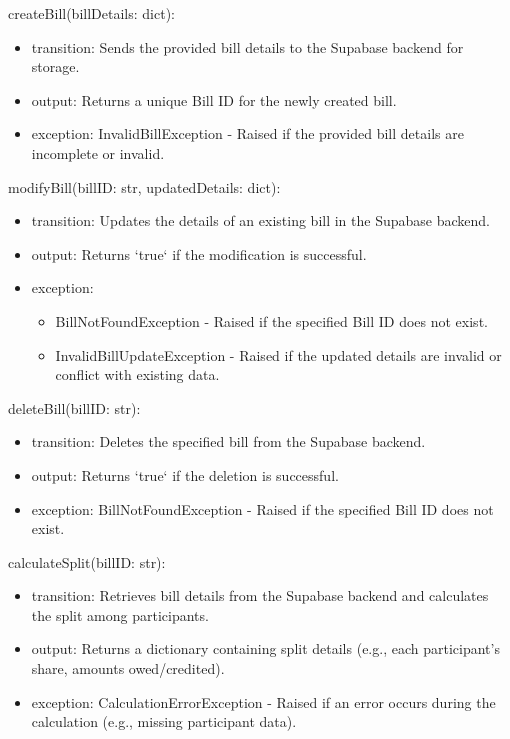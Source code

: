 \documentclass[12pt, titlepage]{article}
\begin{document}
\noindent createBill(billDetails: dict):
\begin{itemize}
\item transition: Sends the provided bill details to the Supabase backend for storage.
\item output: Returns a unique Bill ID for the newly created bill.
\item exception: InvalidBillException - Raised if the provided bill details are incomplete or invalid.
\end{itemize}

\noindent modifyBill(billID: str, updatedDetails: dict):
\begin{itemize}
\item transition: Updates the details of an existing bill in the Supabase backend.
\item output: Returns `true` if the modification is successful.
\item exception: 
  \begin{itemize}
    \item BillNotFoundException - Raised if the specified Bill ID does not exist.
    \item InvalidBillUpdateException - Raised if the updated details are invalid or conflict with existing data.
  \end{itemize}
\end{itemize}

\noindent deleteBill(billID: str):
\begin{itemize}
\item transition: Deletes the specified bill from the Supabase backend.
\item output: Returns `true` if the deletion is successful.
\item exception: BillNotFoundException - Raised if the specified Bill ID does not exist.
\end{itemize}

\noindent calculateSplit(billID: str):
\begin{itemize}
\item transition: Retrieves bill details from the Supabase backend and calculates the split among participants.
\item output: Returns a dictionary containing split details (e.g., each participant's share, amounts owed/credited).
\item exception: CalculationErrorException - Raised if an error occurs during the calculation (e.g., missing participant data).
\end{itemize}
\end{document}
